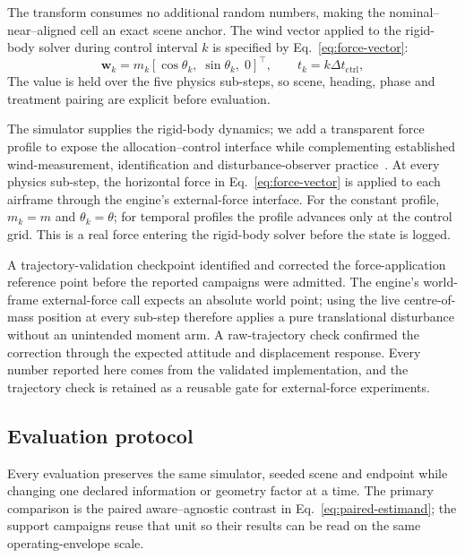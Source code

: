The transform consumes no additional random numbers, making the
nominal--near--aligned cell an exact scene anchor. The wind vector applied to
the rigid-body solver during control interval $k$ is specified by
Eq.~\eqref{eq:force-vector}:
\begin{equation}
  \mathbf{w}_k=m_k[\cos\theta_k,\;\sin\theta_k,\;0]^{\top},
  \qquad t_k=k\Delta t_{\mathrm{ctrl}},
  \label{eq:force-vector}
\end{equation}
The value is held over the five physics sub-steps, so scene, heading, phase and
treatment pairing are explicit before evaluation.

The simulator supplies the rigid-body dynamics; we add a transparent force
profile to expose the allocation--control interface while complementing established
wind-measurement, identification and
disturbance-observer practice~\cite{abichandani2020wind,wi2024windstress,
chen2016dobc,rodriguezmata2018highgain,wang2021esoquadrotor}. At every physics
sub-step, the horizontal force in
Eq.~\eqref{eq:force-vector} is applied to each airframe through the engine's
external-force interface. For the constant profile, $m_k=m$ and
$\theta_k=\theta$; for temporal profiles the profile advances only at the
control grid. This is a real force entering the rigid-body solver before the state
is logged.

A trajectory-validation checkpoint identified and corrected the force-application
reference point before the reported campaigns were admitted. The engine's
world-frame external-force call expects an absolute world point; using the live
centre-of-mass position at every sub-step therefore applies a pure translational
disturbance without an unintended moment arm. A raw-trajectory check confirmed
the correction through the expected attitude and displacement response. Every
number reported here comes from the validated implementation, and the trajectory
check is retained as a reusable gate for external-force experiments.

\subsection{Evaluation protocol}

Every evaluation preserves the same simulator, seeded scene and endpoint while
changing one declared information or geometry factor at a time. The primary
comparison is the paired aware--agnostic contrast in Eq.~\eqref{eq:paired-estimand};
the support campaigns reuse that unit so their results can be read on the same
operating-envelope scale.

